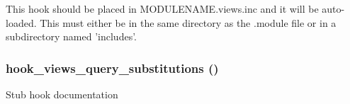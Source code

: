 This hook should be placed in MODULENAME.views.inc and it will be auto-loaded. This must either be in the same directory as the .module file or in a subdirectory named 'includes'. \hypertarget{group__views__hooks_g2a2f60cadfec300b51a4960080ef8ac5}{
\subsubsection[{hook\_\-views\_\-query\_\-substitutions}]{\setlength{\rightskip}{0pt plus 5cm}hook\_\-views\_\-query\_\-substitutions ()}}
\label{group__views__hooks_g2a2f60cadfec300b51a4960080ef8ac5}


Stub hook documentation 